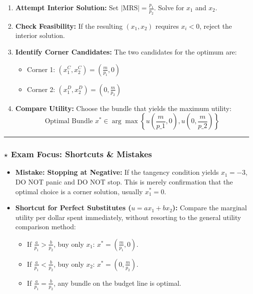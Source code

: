 \documentclass{article}
\begin{document}
\begin{enumerate}
    \item \textbf{Attempt Interior Solution:} Set $|\text{MRS}| = \frac{p_1}{p_2}$. Solve for $x_1$ and $x_2$.
    \item \textbf{Check Feasibility:} If the resulting $(x_1, x_2)$ requires $x_i < 0$, reject the interior solution.
    \item \textbf{Identify Corner Candidates:} The two candidates for the optimum are:
    \begin{itemize}
        \item Corner 1: $(x_1^C, x_2^C) = (\frac{m}{p_1}, 0)$
        \item Corner 2: $(x_1^D, x_2^D) = (0, \frac{m}{p_2})$
    \end{itemize}
    \item \textbf{Compare Utility:} Choose the bundle that yields the maximum utility: \[\text{Optimal Bundle } x^* \in \arg\max \left\{ u\left(\frac{m}{p\_1}, 0\right), u\left(0, \frac{m}{p\_2}\right) \right\}\]
\end{enumerate}

\noindent\rule{\linewidth}{0.4pt}

\subsubsection*{$\star$ Exam Focus: Shortcuts \& Mistakes}

\begin{itemize}
    \item \textbf{Mistake: Stopping at Negative:} If the tangency condition yields $x_1=-3$, DO NOT panic and DO NOT stop. This is merely confirmation that the optimal choice is a corner solution, usually $x_1^*=0$.
    \item \textbf{Shortcut for Perfect Substitutes ($u=ax_1 + bx_2$):} Compare the marginal utility per dollar spent immediately, without resorting to the general utility comparison method:
    \begin{itemize}
        \item If $\frac{a}{p_1} > \frac{b}{p_2}$, buy only $x_1$: $x^* = (\frac{m}{p_1}, 0)$.
        \item If $\frac{a}{p_1} < \frac{b}{p_2}$, buy only $x_2$: $x^* = (0, \frac{m}{p_2})$.
        \item If $\frac{a}{p_1} = \frac{b}{p_2}$, any bundle on the budget line is optimal.
    \end{itemize}
\end{itemize}
\end{document}
